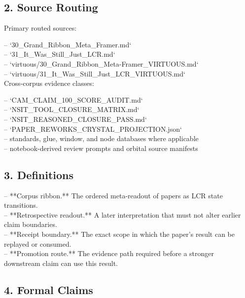 \documentclass[11pt]{article}
\begin{document}
\subsection*{2. Source Routing}

Primary routed sources:

\noindent{}-- `30\_Grand\_Ribbon\_Meta\_Framer.md`\\
\noindent{}-- `31\_It\_Was\_Still\_Just\_LCR.md`\\
\noindent{}-- `virtuous/30\_Grand\_Ribbon\_Meta-Framer\_VIRTUOUS.md`\\
\noindent{}-- `virtuous/31\_It\_Was\_Still\_Just\_LCR\_VIRTUOUS.md`\\

Cross-corpus evidence classes:

\noindent{}-- `CAM\_CLAIM\_100\_SCORE\_AUDIT.md`\\
\noindent{}-- `NSIT\_TOOL\_CLOSURE\_MATRIX.md`\\
\noindent{}-- `NSIT\_REASONED\_CLOSURE\_PASS.md`\\
\noindent{}-- `PAPER\_REWORKS\_CRYSTAL\_PROJECTION.json`\\
\noindent{}-- standards, glue, window, and node databases where applicable\\
\noindent{}-- notebook-derived review prompts and orbital source manifests\\

\subsection*{3. Definitions}

\noindent{}-- **Corpus ribbon.** The ordered meta-readout of papers as LCR state transitions.\\
\noindent{}-- **Retrospective readout.** A later interpretation that must not alter earlier claim boundaries.\\
\noindent{}-- **Receipt boundary.** The exact scope in which the paper's result can be replayed or consumed.\\
\noindent{}-- **Promotion route.** The evidence path required before a stronger downstream claim can use this result.\\

\subsection*{4. Formal Claims}
\end{document}
